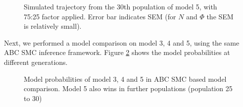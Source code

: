 \begin{figure}[H]
    \begin{center}
    \end{center}

    \caption[Simulated trajectory from the 30th population of model 5, with 75:25 factor applied]{Simulated trajectory from the 30th population of model 5, with 75:25 factor applied. Error bar indicates SEM (for $N$ and $\Phi$ the SEM is relatively small).}
    \label{fig:overfit}
\end{figure}


Next, we performed a model comparison on model 3, 4 and 5, using the same ABC SMC inference framework. Figure \ref{fig:model345cmp} shows the model probabilities at different generations.

\begin{figure}[H]
    \begin{center}
    \end{center}

    \caption[Model probabilities of model 3, 4 and 5 in ABC SMC based model comparison]{Model probabilities of model 3, 4 and 5 in ABC SMC based model comparison. Model 5 also wins in further populations (population 25 to 30)}
    \label{fig:model345cmp}
\end{figure}

